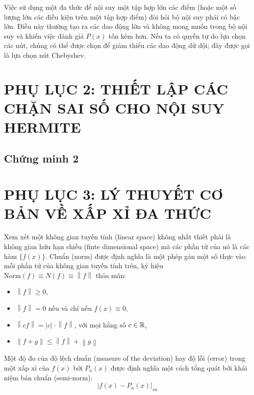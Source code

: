Việc sử dụng một đa thức để nội suy một tập hợp lớn các điểm (hoặc một số lượng lớn các điều kiện trên một tập hợp điểm) đòi hỏi bộ nội suy phải có bậc lớn. Điều này thường tạo ra các dao động lớn và không mong muốn trong bộ nội suy và khiến việc đánh giá $P(x)$ tốn kém hơn. Nếu ta có quyền tự do lựa chọn các nút, chúng có thể được chọn để giảm thiểu các dao động dữ dội; đây được gọi là lựa chọn nút Chebyshev.

\chapter*{PHỤ LỤC 2: THIẾT LẬP CÁC CHẶN SAI SỐ CHO NỘI SUY HERMITE}


\section{Chứng minh 2}


\chapter*{PHỤ LỤC 3: LÝ THUYẾT CƠ BẢN VỀ XẤP XỈ ĐA THỨC}

Xem xét một không gian tuyến tính (linear space) không nhất thiết phải là không gian hữu hạn chiều (finte dimensional space) mà các phần tử của nó là các hàm $\{f(x)\}$. Chuẩn (norm) được định nghĩa là một phép gán một số thực vào mỗi phần tử của không gian tuyến tính trên, ký hiệu $\text{Norm}(f) \equiv N(f) \equiv \left \|  f\right \|$ thỏa mãn:
\begin{itemize}
    \item $\left \|  f\right \| \geq 0$,
    \item $\left \|  f\right \| = 0$ nếu và chỉ nếu $f(x) \equiv 0$,
    \item $\left \|  cf\right \| =  \left | c \right |\cdot \left \|  f\right \|$, với mọi hằng số $c \in \mathbb{R}$,
    \item $\left \|  f + g\right \| \leq \left \|  f\right \| + \left \|  g\right \|$
\end{itemize}

Một độ đo của độ lệch chuẩn (measure of the deviation) hay độ lỗi (error) trong một xấp xỉ của $f(x)$ bởi $P_n(x)$ được định nghĩa một cách tổng quát bởi khái niệm bán chuẩn (semi-norm):
\begin{equation}
    \left | f(x) - P_n(x) \right |_{sn}
\end{equation}

